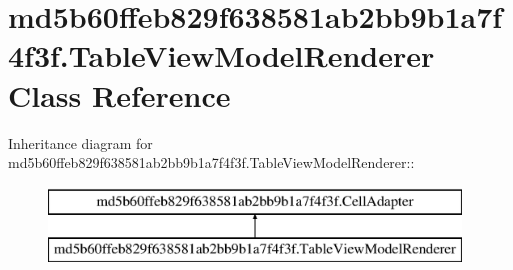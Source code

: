 \hypertarget{classmd5b60ffeb829f638581ab2bb9b1a7f4f3f_1_1_table_view_model_renderer}{
\section{md5b60ffeb829f638581ab2bb9b1a7f4f3f.TableViewModelRenderer Class Reference}
\label{classmd5b60ffeb829f638581ab2bb9b1a7f4f3f_1_1_table_view_model_renderer}
}
Inheritance diagram for md5b60ffeb829f638581ab2bb9b1a7f4f3f.TableViewModelRenderer::\begin{figure}[H]
\begin{center}
\leavevmode
\includegraphics[height=2cm]{classmd5b60ffeb829f638581ab2bb9b1a7f4f3f_1_1_table_view_model_renderer}
\end{center}
\end{figure}

